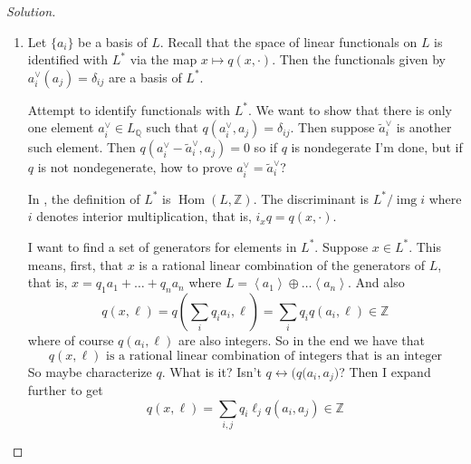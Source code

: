 \begin{proof}[Solution]\leavevmode
\begin{enumerate}[label=\alph*.]
	\item			Let $\{a_i\}$ be a basis of $L$. Recall that the space of linear functionals on $L$ is identified with  $L^*$ via the map $x\mapsto q(x,\cdot )$. Then the functionals given by $a^\vee_i(a_j)= \delta_{ij}$ are a basis of $L^*$.
	\vspace{1em}
\begin{idea2}{Attempt to identify functionals with $L^*$.}\leavevmode
		\iffalse$\mathsf{OK}$ its rather stupid but I would like to make the following identification explicit:
		\begin{align*}
			L^* &\longrightarrow L^\star \\
			x &\longmapsto q(x,\cdot )
		\end{align*}
		where $L^\star$  is the set of linear forms on $L$. {\color{2}But the kernel of this map is trivial only when $q$ is nondegenerate.}

		\fi We want to show that there is only one element $a^\vee_i\in L_\mathbb{Q}$ such that $q(a^\vee_i,a_j)=\delta_{ij}$. Then suppose $\tilde{a}^\vee _i$ is another such element. Then $q(a^\vee_i-\tilde{a}^\vee_i,a_j)=0$ so if $q$ is nondegerate I'm done, but if $q$ is not nondegenerate, {\color{2}how to prove $a^\vee_i=\tilde{a}^\vee_i$?}
\end{idea2}

		\begin{remark}\leavevmode
			In \cite{quadratic}, the definition of $L^*$ is $\operatorname{Hom}(L,\mathbb{Z})$. The discriminant is $L^*/\operatorname{img} i$ where $i$ denotes interior multiplication, that is, $i_xq=q(x, \cdot )$.
		\end{remark}

\iffalse
		I want to find a set of generators for elements in $L^*$. Suppose $x\in L^*$. This means, first, that $x$ is a rational linear combination of the generators of  $L$, that is, $x=q_1a_1+\ldots +q_na_n$ where $L=\left<a_1\right> \oplus \ldots \left<a_n\right> $. And also 
		\[q(x,\ell)=q\left( \sum_{i}q_ia_i,\ell \right) =\sum_{i}q_iq(a_i,\ell)\in\mathbb{Z}\]
		where of course $q(a_i,\ell)$ are also integers. So in the end we have that
		\[q(x,\ell)\text{ is a rational linear combination of integers that is an integer} \]
		So maybe characterize $q$. What is it? Isn't $q\longleftrightarrow \big(q(a_i,a_j\big)$? Then I expand further to get
		\[q(x,\ell)=\sum_{i,j}q_i\ell_jq(a_i,a_j)\in\mathbb{Z}\]


\end{enumerate}
\end{proof}
